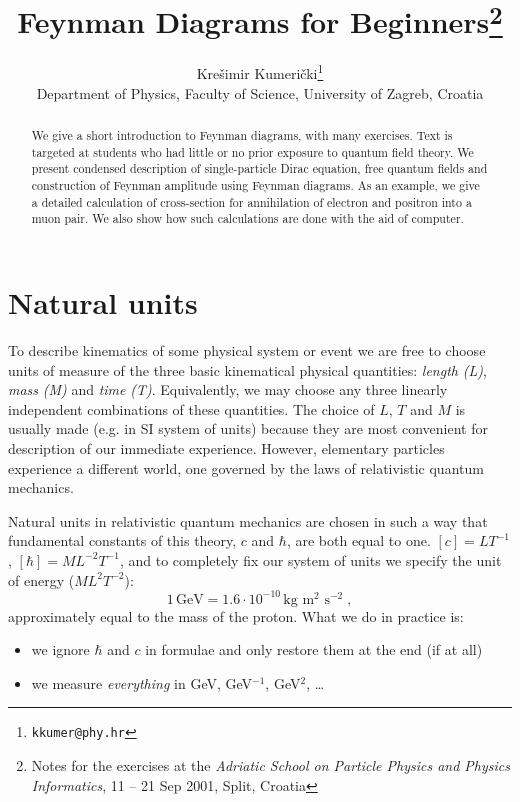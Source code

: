 \documentclass[a4paper,11pt]{article}
\theoremstyle{break}
\theoremstyle{plain}
\begin{document}

\title{ \Huge {Feynman Diagrams for Beginners}\footnote{%
Notes for the exercises at the
\emph{Adriatic School on Particle Physics and Physics Informatics},
11 -- 21 Sep 2001, Split, Croatia}
}

\author{{Krešimir Kumerički}\footnote{\scriptsize\texttt{kkumer@phy.hr}}\\[2ex]
\small Department of Physics, Faculty of Science, University of Zagreb, Croatia}
\date{}
\maketitle

\begin{abstract}                              
  We give a short introduction to Feynman diagrams, with many exercises.
  Text is targeted at students who had little or no prior exposure to
  quantum field theory. We present condensed description of single-particle 
  Dirac equation,
  free quantum fields and construction of Feynman amplitude using
  Feynman diagrams. As an example, we give a detailed calculation of
  cross-section for annihilation of electron and positron into a muon pair.
  We also show how such calculations are done with the aid of computer.
\end{abstract}      

\tableofcontents

\newpage

\section{Natural units}

To describe kinematics of some physical system or event we are free to choose
units of measure of the three basic kinematical physical
quantities: \emph{length} \emph{(L)}, \emph{mass} \emph{(M)} and
\emph{time} \emph{(T)}. Equivalently, we may choose any three linearly
independent combinations of these quantities.
The choice of $L$, $T$ and $M$ is usually made (e.g. in SI system of
units) because they are most convenient for description of our immediate
experience. However, elementary particles experience a different world,
one governed by the laws of relativistic quantum mechanics.

Natural units in relativistic quantum mechanics are chosen in such a
way that
fundamental constants of this theory, $c$ and $\hbar$, are both equal to one.
$[c]=LT^{-1}$, $[\hbar]=ML^{-2}T^{-1}$, and to completely fix our system
of units we specify the unit of energy ($ML^2T^{-2}$):
\[
  1\,\mbox{GeV} = 1.6\cdot 10^{-10}\,\mbox{kg m$^2$ s$^{-2}$} \;,
\]
approximately equal to the mass of the proton.
What we do in practice is:
\begin{itemize}
\item we ignore $\hbar$ and $c$ in  formulae and only restore them at the
  end (if at all)
\item we measure \emph{everything} in GeV, GeV$^{-1}$, GeV$^2$, \ldots
\end{itemize}
\end{document}
